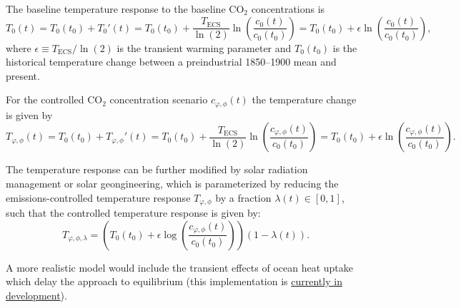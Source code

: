 \documentclass{article}
\begin{document}

The baseline temperature response to the baseline CO$_{2}$ concentrations is 
\begin{equation}
    T_{0}(t) = T_{0}(t_{0}) + T_{0}'(t) =  
    T_{0}(t_{0}) + 
    \frac{T_{\text{ECS}}}{\ln(2)} \ln(\frac{c_{0}(t)}{c_{0}(t_{0})}) = 
    T_{0}(t_{0}) + 
    \epsilon \ln(\frac{c_{0}(t)}{c_{0}(t_{0})}),
\end{equation}
where $\epsilon \equiv T_{\text{ECS}} / \ln(2)$ is the transient warming parameter and $T_{0}(t_{0})$ is the historical temperature change between a preindustrial 1850–1900 mean and present.

For the controlled CO$_{2}$ concentration scenario $c_{\varphi,\phi}(t)$ the temperature change is given by
\begin{equation}
    T_{\varphi,\phi}(t) = T_{0}(t_{0}) + T_{\varphi, \phi}'(t) =
    T_{0}(t_{0}) + 
    \frac{T_{\text{ECS}}}{\ln(2)} \ln(\frac{c_{\varphi,\phi}(t)}{c_{0}(t_{0})}) = 
    T_{0}(t_{0}) + 
    \epsilon \ln(\frac{c_{\varphi,\phi}(t)}{c_{0}(t_{0})}).
\end{equation}


The temperature response can be further modified by solar radiation management or solar geongineering, which is parameterized by reducing the emissions-controlled temperature response $T_{\varphi,\phi}$ by a fraction $\lambda(t) \in [0,1]$, such that the controlled temperature response is given by:
\begin{equation}
    T_{\varphi, \phi, \lambda} = \left(
    T_{0}(t_{0}) + 
    \epsilon \log(\frac{c_{\varphi,\phi}(t)}{c_{0}(t_{0})}) 
    \right) (1 - \lambda(t)).
\end{equation}

A more realistic model would include the transient effects of ocean heat uptake which delay the approach to equilibrium \citep{Held2014} (this implementation is \textcolor{blue}{\href{https://github.com/hdrake/OptimizeClimate/tree/two-box-temperature}{currently in development}}).
\end{document}
